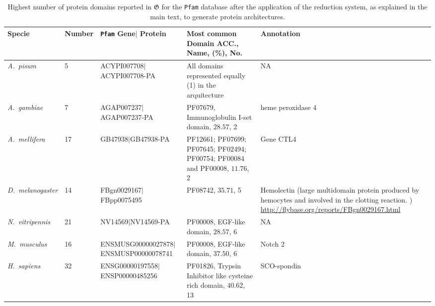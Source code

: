 \documentclass[12pt]{article}
\begin{document}
\begin{table}[ht!]
\begin{center}
\small
\caption{Highest number of protein domains reported in 
$\boldsymbol{\mathfrak{G}}$ for the \texttt{Pfam} database after the 
application of the reduction system, as explained in the main text, to 
generate protein architectures.} 
\label{tab:greatestPfamReduced}
\begin{adjustbox}{angle=90}
\begin{tabular}{lp{1.5cm}p{8.5cm}p{3.5cm}p{3.5cm}}
\toprule
\textbf{Specie} & \textbf{Number} &\texttt{Pfam} \textbf{Gene$|$ Protein}& 
\textbf{Most common Domain ACC., Name, (\%), No.} &  
\textbf{Annotation} \\
\midrule
\textit{A.\ pisum} & 5 & ACYPI007708$|$ACYPI007708-PA & All domains represented 
equally (1) in the arquitecture & NA \\
\textit{A.\ gambiae} & 7 & AGAP007237$|$AGAP007237-PA & PF07679, Immunoglobulin 
I-set domain, $28.57$, 2 & heme peroxidase 4 \\
\textit{A.\ mellifera} & 17 & GB47938$|$GB47938-PA & 
PF12661; PF07699; PF07645; PF02494; PF00754; PF00084 and PF00008, 
$11.76$, 2 & Gene CTL4 \\
\textit{D.\ melanogaster} & 14 & FBgn0029167$|$FBpp0075495 & PF08742, $35.71$, 
5 & Hemolectin (large multidomain protein produced by hemocytes and involved in 
the clotting reaction. ) \url{http://flybase.org/reports/FBgn0029167.html}\\
\textit{N.\ vitripennis} & 21 & NV14569$|$NV14569-PA & PF00008, EGF-like 
domain, $28.57$, 6 & NA \\
\midrule
\textit{M.\ musculus} & 16 & ENSMUSG00000027878$|$ENSMUSP00000078741 & PF00008, 
EGF-like domain, $37.50$, 6& Notch 2 \\
\textit{H.\ sapiens} & 32 & ENSG00000197558$|$ENSP00000485256 & PF01826, 
Trypsin Inhibitor like cysteine rich domain, $40.62$, 13 & 
SCO-spondin \\
\bottomrule
\end{tabular}
\end{adjustbox}
\end{center}
\end{table}
\end{document}
